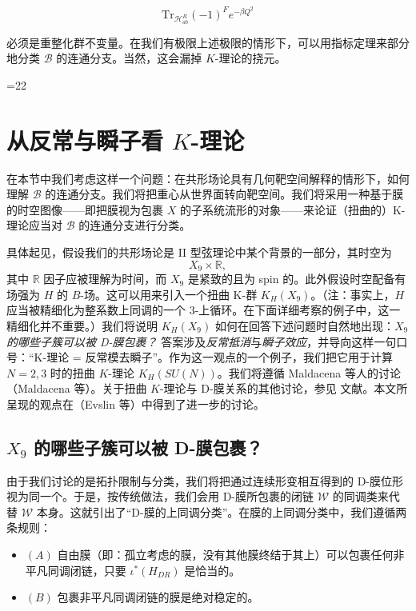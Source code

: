 \documentclass[11pt,a4paper]{ctexart}
\newcommand{\SrcRange}[2]{\ifnum#1=#2\marginpar{\raggedright\footnotesize 原文 p.#1}\else\marginpar{\raggedright\footnotesize 原文 pp.#1--#2}\fi}
\begin{document}
\[{\mathrm{Tr}}_{{\mathcal H}_{ab}^R} (-1)^F e^{-\beta Q^2}\]

必须是重整化群不变量。在我们有极限上述极限的情形下，可以用指标定理来部分地分类 \({\mathcal B}\) 的连通分支。当然，这会漏掉 \(K\)-理论的挠元。

\SrcRange{16}{22}
\section{\texorpdfstring{从反常与瞬子看 \(K\)-理论}{从反常与瞬子看 K-理论}}\label{ux4eceux53cdux5e38ux4e0eux77acux5b50ux770b-k-ux7406ux8bba}

在本节中我们考虑这样一个问题：在共形场论具有几何靶空间解释的情形下，如何理解 \({\mathcal B}\) 的连通分支。我们将把重心从世界面转向靶空间。我们将采用一种基于膜的时空图像------即把膜视为包裹 \(X\) 的子系统流形的对象------来论证（扭曲的）K-理论应当对 \({\mathcal B}\) 的连通分支进行分类。

具体起见，假设我们的共形场论是 II 型弦理论中某个背景的一部分，其时空为 \[X_9 \times \mathbb{R},\] 其中 \(\mathbb{R}\) 因子应被理解为时间，而 \(X_9\) 是紧致的且为 spin 的。此外假设时空配备有场强为 \(H\) 的 \(B\)-场。这可以用来引入一个扭曲 K-群 \(K_H(X_9)\)。（注：事实上，\(H\) 应当被精细化为整系数上同调的一个 3-上循环。在下面详细考察的例子中，这一精细化并不重要。）我们将说明 \(K_H(X_9)\) 如何在回答下述问题时自然地出现：\emph{\(X_9\) 的哪些子簇可以被 D-膜包裹？} 答案涉及\emph{反常抵消}与\emph{瞬子效应}，并导向这样一句口号：``K-理论 = 反常模去瞬子''。作为这一观点的一个例子，我们把它用于计算 \(N=2,3\) 时的扭曲 \(K\)-理论 \(K_H(SU(N))\)。我们将遵循 Maldacena 等人的讨论（Maldacena 等）。关于扭曲 \(K\)-理论与 D-膜关系的其他讨论，参见 文献。本文所呈现的观点在（Evslin 等）中得到了进一步的讨论。

\subsection{\texorpdfstring{\(X_9\) 的哪些子簇可以被 D-膜包裹？}{X\_9 的哪些子簇可以被 D-膜包裹？}}\label{x_9-ux7684ux54eaux4e9bux5b50ux7c07ux53efux4ee5ux88ab-d-ux819cux5305ux88f9}

由于我们讨论的是拓扑限制与分类，我们将把通过连续形变相互得到的 D-膜位形视为同一个。于是，按传统做法，我们会用 D-膜所包裹的闭链 \({\mathcal W}\) 的同调类来代替 \({\mathcal W}\) 本身。这就引出了``D-膜的上同调分类''。在膜的上同调分类中，我们遵循两条规则：

\begin{itemize}
\item
  \((A)\) 自由膜（即：孤立考虑的膜，没有其他膜终结于其上）可以包裹任何非平凡同调闭链，只要 \(\iota^*(H_{DR})\) 是恰当的。
\item
  \((B)\) 包裹非平凡同调闭链的膜是绝对稳定的。
\end{itemize}
\end{document}

